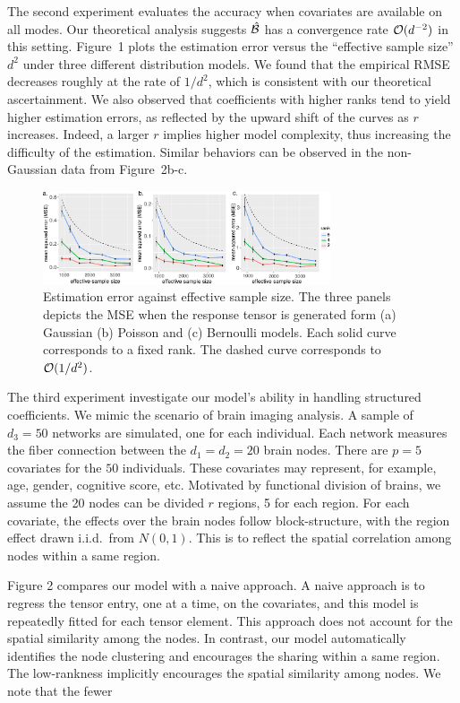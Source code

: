 \documentclass[11pt]{article}
\theoremstyle{plain}
\theoremstyle{definition}
\begin{document}
{The second experiment evaluates the accuracy when covariates are available on all modes. Our theoretical analysis suggests $\hat {\mathcal{B}}$ has a convergence rate $\mathcal{O}(d^{-2})$ in this setting. Figure~1 plots the estimation error versus the ``effective sample size'' $d^2$ under three different distribution models. We found that the empirical RMSE decreases roughly at the rate of $1/d^2$, which is consistent with our theoretical ascertainment. We also observed that coefficients with higher ranks tend to yield higher estimation errors, as reflected by the upward shift of the curves as $r$ increases. Indeed, a larger $r$ implies higher model complexity, thus increasing the difficulty of the estimation. Similar behaviors can be observed in the non-Gaussian data from Figure~2b-c. 

\begin{figure}[H]
\includegraphics[width=8.5cm]{..//../code/binary_tucker/team/figure/dimension.pdf}
\caption{Estimation error against effective sample size. The three panels depicts the MSE when the response tensor is generated form (a) Gaussian (b) Poisson and (c) Bernoulli models. Each solid curve corresponds to a fixed rank. The dashed curve corresponds to $\mathcal{O}({1/d^2})$.}
\end{figure}

The third experiment investigate our model's ability in handling structured coefficients. We mimic the scenario of brain imaging analysis. A sample of $d_3=50$ networks are simulated, one for each individual. Each network measures the fiber connection between the $d_1=d_2=20$ brain nodes. There are $p=5$ covariates for the $50$ individuals. These covariates may represent, for example, age, gender, cognitive score, etc. Motivated by functional division of brains, we assume the 20 nodes can be divided $r$ regions, 5 for each region. For each covariate, the effects over the brain nodes follow block-structure, with the region effect drawn i.i.d.\ from $N(0,1)$. This is to reflect the spatial correlation among nodes within a same region. 

Figure 2 compares our model with a naive approach. A naive approach is to regress the tensor entry, one at a time, on the covariates, and this model is repeatedly fitted for each tensor element. This approach does not account for the spatial similarity among the nodes. In contrast, our model automatically identifies the node clustering and encourages the sharing within a same region. The low-rankness implicitly encourages the spatial similarity among nodes. We note that the fewer 

}
\end{document}
